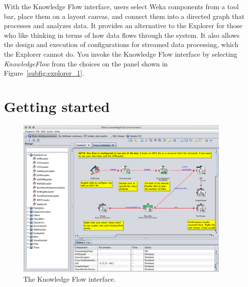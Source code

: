 With the Knowledge Flow interface, users select Weka components from a
tool bar, place them on a layout canvas, and connect them into a
directed graph that processes and analyzes data. It provides an
alternative to the Explorer for those who like thinking in terms of
how data flows through the system. It also allows the design and
execution of configurations for streamed data processing, which the
Explorer cannot do. You invoke the Knowledge Flow interface by
selecting \textit{KnowledgeFlow} from the choices on the panel shown
in Figure~\ref{subfig:explorer_1}.

\section{Getting started}

\begin{figure}[!th]
\centering
\includegraphics[width=0.95\textwidth]{images/B3_1.png}
\caption{The Knowledge Flow interface.}
\label{fig:knowledge_flow}
\end{figure}

